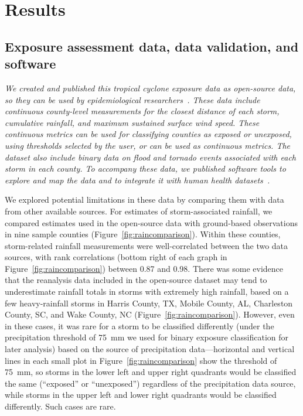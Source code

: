 \section*{Results}

\subsection*{Exposure assessment data, data validation, and software}

\textit{We created and published this tropical cyclone exposure data as open-source
data, so they can be used by epidemiological
researchers~\parencite{hurricaneexposuredata}. These data include continuous
county-level measurements for the closest distance of each storm, cumulative
rainfall, and maximum sustained surface wind speed. These continuous metrics
can be used for classifying counties as exposed or unexposed, using thresholds
selected by the user, or can be used as continuous metrics. The dataset also
include binary data on flood and tornado events associated with each storm in
each county. To accompany these data, we published software tools to explore
and map the data and to integrate it with human health
datasets~\parencite{hurricaneexposure}.}

We explored potential limitations in these data by comparing them with data
from other available sources.  For estimates of storm-associated rainfall, we
compared estimates used in the open-source data with ground-based observations
in nine sample counties (Figure~\ref{fig:raincomparison}). Within these
counties, storm-related rainfall measurements were well-correlated between the
two data sources, with rank correlations (bottom right of each graph in
Figure~\ref{fig:raincomparison}) between 0.87 and 0.98. There was some evidence
that the reanalysis data included in the open-source dataset may tend to
underestimate rainfall totals in storms with extremely high rainfall, based on
a few heavy-rainfall storms in Harris County, TX, Mobile County, AL, Charleston
County, SC, and Wake County, NC (Figure~\ref{fig:raincomparison}). However,
even in these cases, it was rare for a storm to be classified differently
(under the precipitation threshold of 75~\si{\milli\metre} we used for binary
exposure classification for later analysis) based on the source of
precipitation data---horizontal and vertical lines in each small plot in
Figure~\ref{fig:raincomparison} show the threshold of 75~\si{\milli\metre}, so
storms in the lower left and upper right quadrants would be classified the same
(``exposed'' or ``unexposed'') regardless of the precipitation data source,
while storms in the upper left and lower right quadrants would be classified
differently. Such cases are rare.

